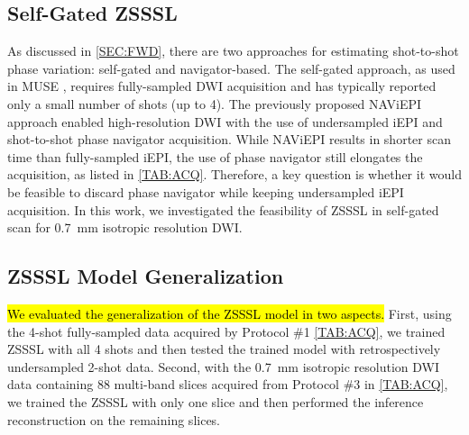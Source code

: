 \documentclass[journal,twoside,web]{ieeecolor}
\begin{document}
	\subsection{Self-Gated ZSSSL}

	As discussed in \cref{SEC:FWD}, there are two approaches for
	estimating shot-to-shot phase variation: self-gated and navigator-based.
	The self-gated approach, as used in MUSE \cite{chen_2013_muse},
	requires fully-sampled DWI acquisition and
	has typically reported only a small number of shots (up to 4).
	The previously proposed NAViEPI approach enabled high-resolution DWI
	with the use of undersampled iEPI and shot-to-shot phase navigator acquisition.
	While NAViEPI results in shorter scan time than fully-sampled iEPI,
	the use of phase navigator still elongates the acquisition,
	as listed in \cref{TAB:ACQ}.
	Therefore, a key question is whether it would be feasible to
	discard phase navigator while keeping undersampled iEPI acquisition.
	In this work, we investigated the feasibility of ZSSSL in self-gated scan
	for \SI{0.7}{\milli\meter} isotropic resolution DWI.

	\subsection{ZSSSL Model Generalization} \label{SEC:ZSSSL_GEN}

	\hl{We evaluated the generalization of the ZSSSL model in two aspects.}
	First, using the 4-shot fully-sampled data acquired by
	Protocol \#1 \cref{TAB:ACQ}, we trained ZSSSL with all 4 shots
	and then tested the trained model with retrospectively undersampled 2-shot data.
	Second, with the \SI{0.7}{\milli\meter} isotropic resolution DWI data
	containing 88 multi-band slices acquired from Protocol \#3 in \cref{TAB:ACQ},
	we trained the ZSSSL with only one slice and
	then performed the inference reconstruction on the remaining slices.

\end{document}
